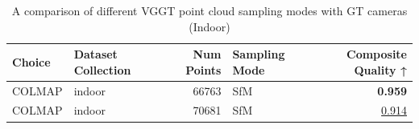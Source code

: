 \begin{table}[H]
\caption{\ifdefined\customcaption \customcaption \else A comparison of different VGGT point cloud sampling modes with GT cameras (Indoor) \fi}
\label{tab:03_sampling_mode_brief_indoor}
\centering
\scriptsize
\begin{tabular}{llrlr}
\toprule
Choice & Dataset Collection & Num Points & Sampling Mode & Composite Quality ↑ \\
\midrule
COLMAP & indoor & 66763 & SfM & \textbf{0.959} \\
COLMAP & indoor & 70681 & SfM & \underline{0.914} \\
\bottomrule
\end{tabular}
\end{table}
